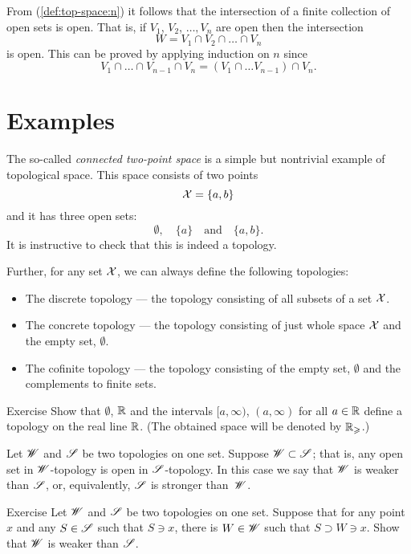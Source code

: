 From (\ref{def:top-space:n}) it follows that the intersection of a finite collection of open sets is open.
That is, if $V_1$, $V_2$, $\dots, V_n$ are open then the intersection 
\[W=V_1 \cap V_2\cap\dots\cap V_n\] is open.
This can be proved by applying induction on $n$ since 
\[V_1 \cap \dots\cap V_{n-1}\cap V_n=(V_1 \cap \dots V_{n-1})\cap V_n.\]

\section{Examples}

The so-called \emph{connected two-point space} is a simple but nontrivial example of topological space.
This space consists of two points 
\[\mathcal{X}=\{a,b\}\]
and it has three open sets: 
\[\emptyset,\quad \{a\}\quad\text{and}\quad\{a,b\}.\]
It is instructive to check that this is indeed a topology.

Further, for any set $\mathcal{X}$, we can always define the following topologies:
\begin{itemize} 
\item  The discrete topology --- the topology consisting of all subsets of a set $\mathcal{X}$.
\item  The concrete topology  --- the topology consisting of just whole space $\mathcal{X}$ and the empty set, $\emptyset$.
\item  The cofinite topology --- the topology consisting of the empty set, $\emptyset$ and the complements to finite sets.
\end{itemize}

\begin{thm}{Exercise}\label{ex:Rge}
Show that $\emptyset$, $\mathbb{R}$ and the intervals $[a,\infty)$, $(a,\infty)$ for all $a\in\mathbb{R}$ define a topology on the real line $\mathbb{R}$.
(The obtained space will be denoted by $\mathbb{R}_\geqslant$.)
\end{thm}

Let $\mathscr{W}$ and $\mathscr{S}$ be two topologies on one set.
Suppose $\mathscr{W}\subset\mathscr{S}$; that is, any open set in $\mathscr{W}$-topology is open in $\mathscr{S}$-topology.
In this case we say that $\mathscr{W}$ is weaker than $\mathscr{S}$, or, equivalently, $\mathscr{S}$ is stronger than~$\mathscr{W}$.

\begin{thm}{Exercise}
Let $\mathscr{W}$ and $\mathscr{S}$ be two topologies on one set.
Suppose that for any point $x$ and any $S\in \mathscr{S}$ such that $S\ni x$, there is $W\in\mathscr{W}$ such that 
$S\supset W\ni x$.
Show that $\mathscr{W}$ is weaker than $\mathscr{S}$.
\end{thm}



